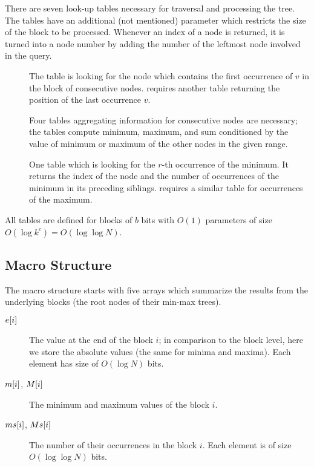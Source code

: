 There are seven look-up tables necessary for traversal and processing the tree.
The tables have an additional (not mentioned) parameter which restricts the size of the block to be processed.
Whenever an index of a node is returned, it is turned into a node number by adding the number of the leftmost node involved in the query.
\begin{description}
	\item[\fwdSearch]
	The table is looking for the node which contains the first occurrence of $v$ in the block of consecutive nodes.
	\bwdSearch{} requires another table returning the position of the last occurrence $v$.
	
	\item[\rmqInfo]
	Four tables aggregating information for consecutive nodes are necessary; the tables compute minimum, maximum, and sum conditioned by the value of minimum or maximum of the other nodes in the given range.
	
	\item[\rmqSelect]
	One table which is looking for the $r$-th occurrence of the minimum.
	It returns the index of the node and the number of occurrences of the minimum in its preceding siblings.
	\RMQSelect{} requires a similar table for occurrences of the maximum.
\end{description}
All tables are defined for blocks of $b$ bits with $O(1)$ parameters of size $O(\log k^c) = O(\log \log N)$.

\subsection{Macro Structure}

The macro structure starts with five arrays which summarize the results from the underlying blocks (the root nodes of their min-max trees).
\begin{description}
	\item[$e[i\char93$]
	The value at the end of the block $i$; in comparison to the block level, here we store the absolute values (the same for minima and maxima).
	Each element has size of $O(\log N)$ bits.
	
	\item[$m[i\char93$, $M[i\char93$]
	The minimum and maximum values of the block $i$.
	
	\item[$ms[i\char93$, $Ms[i\char93$]
	The number of their occurrences in the block $i$.
	Each element is of size $O(\log \log N)$ bits.
\end{description}

